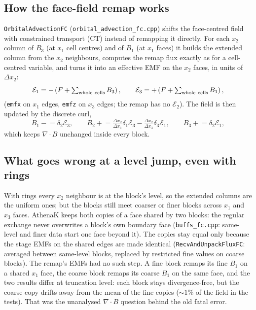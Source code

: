 \documentclass[11pt]{article}
\newcommand{\code}[1]{\texttt{#1}}
\newcommand{\file}[1]{\texttt{\small #1}}
\newcommand{\fn}[1]{\texttt{\small #1}}
\begin{document}
\subsection{How the face-field remap works}
\fn{OrbitalAdvectionFC} (\file{orbital\_advection\_fc.cpp}) shifts the face-centred field
with constrained transport (CT) instead of remapping it directly. For each $x_2$ column of
$B_3$ (at $x_1$ cell centres) and of $B_1$ (at $x_1$ faces) it builds the extended column
from the $x_2$ neighbours, computes the remap flux exactly as for a cell-centred variable,
and turns it into an effective EMF on the $x_2$ faces, in units of $\Delta x_2$:
\begin{equation}
  \mathcal E_1 = -\left(F + \textstyle\sum_{\rm whole\ cells} B_3\right), \qquad
  \mathcal E_3 = +\left(F + \textstyle\sum_{\rm whole\ cells} B_1\right),
\end{equation}
(\code{emfx} on $x_1$ edges, \code{emfz} on $x_3$ edges; the remap has no $\mathcal E_2$).
The field is then updated by the discrete curl,
\begin{equation}
  B_1 \mathrel{-}= \delta_2 \mathcal E_3, \qquad
  B_2 \mathrel{+}= \tfrac{\Delta x_2}{\Delta x_1}\delta_1 \mathcal E_3
                 - \tfrac{\Delta x_2}{\Delta x_3}\delta_3 \mathcal E_1, \qquad
  B_3 \mathrel{+}= \delta_2 \mathcal E_1,
\end{equation}
which keeps $\nabla\!\cdot\!B$ unchanged inside every block.

\subsection{What goes wrong at a level jump, even with rings}
With rings every $x_2$ neighbour is at the block's level, so the extended columns are the
uniform ones; but the blocks still meet coarser or finer blocks across $x_1$ and $x_3$ faces.
AthenaK keeps both copies of a face shared by two blocks: the regular exchange never
overwrites a block's own boundary face (\file{buffs\_fc.cpp}: same-level and finer data
start one face beyond it). The copies stay equal only because the stage EMFs on the shared
edges are made identical (\fn{RecvAndUnpackFluxFC}: averaged between same-level blocks,
replaced by restricted fine values on coarse blocks). The remap's EMFs had no such step. A
fine block remaps its fine $B_1$ on a shared $x_1$ face, the coarse block remaps its coarse
$B_1$ on the same face, and the two results differ at truncation level: each block stays
divergence-free, but the coarse copy drifts away from the mean of the fine copies
($\sim1\%$ of the field in the tests). That was the unanalysed $\nabla\!\cdot\!B$ question
behind the old fatal error.
\end{document}
